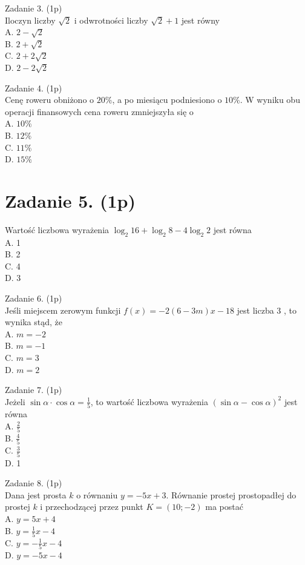 \documentclass[10pt]{article}
\begin{document}
Zadanie 3. (1p)\\
Iloczyn liczby \(\sqrt{2}\) i odwrotności liczby \(\sqrt{2}+1\) jest równy\\
A. \(2-\sqrt{2}\)\\
B. \(2+\sqrt{2}\)\\
C. \(2+2 \sqrt{2}\)\\
D. \(2-2 \sqrt{2}\)

Zadanie 4. (1p)\\
Cenę roweru obniżono o \(20 \%\), a po miesiącu podniesiono o \(10 \%\). W wyniku obu operacji finansowych cena roweru zmniejszyła się o\\
A. \(10 \%\)\\
B. \(12 \%\)\\
C. \(11 \%\)\\
D. \(15 \%\)

\section*{Zadanie 5. (1p)}
Wartość liczbowa wyrażenia \(\log _{2} 16+\log _{2} 8-4 \log _{2} 2\) jest równa\\
A. 1\\
B. 2\\
C. 4\\
D. 3

Zadanie 6. (1p)\\
Jeśli miejscem zerowym funkcji \(f(x)=-2(6-3 m) x-18\) jest liczba 3 , to wynika stąd, że\\
A. \(m=-2\)\\
B. \(m=-1\)\\
C. \(m=3\)\\
D. \(m=2\)

Zadanie 7. (1p)\\
Jeżeli \(\sin \alpha \cdot \cos \alpha=\frac{1}{5}\), to wartość liczbowa wyrażenia \((\sin \alpha-\cos \alpha)^{2}\) jest równa\\
A. \(\frac{2}{5}\)\\
B. \(\frac{4}{5}\)\\
C. \(\frac{3}{5}\)\\
D. 1

Zadanie 8. (1p)\\
Dana jest prosta \(k\) o równaniu \(y=-5 x+3\). Równanie prostej prostopadłej do prostej \(k\) i przechodzącej przez punkt \(K=(10 ;-2)\) ma postać\\
A. \(y=5 x+4\)\\
B. \(y=\frac{1}{5} x-4\)\\
C. \(y=-\frac{1}{5} x-4\)\\
D. \(y=-5 x-4\)
\end{document}
